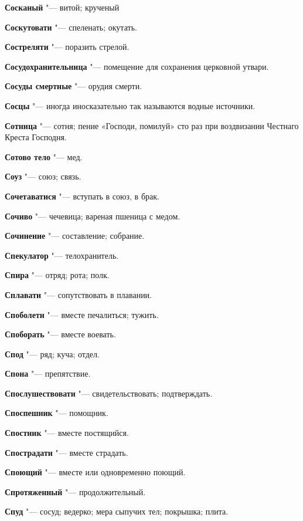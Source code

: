 \begin{mymulticols}
\noindent\textbf{Сосканый} "--- витой; крученый 

\noindent\textbf{Соскутовати} "--- спеленать; окутать. 

\noindent\textbf{Состреляти} "--- поразить стрелой. 

\noindent\textbf{Сосудохранительница} "--- помещение для сохранения церковной утвари. 

\noindent\textbf{Сосуды смертные} "--- орудия смерти. 

\noindent\textbf{Сосцы} "--- иногда иносказательно так называются водные источники. 

\noindent\textbf{Сотница} "--- сотня; пение «Господи, помилуй» сто раз при воздвизании Честнаго Креста Господня. 

\noindent\textbf{Сотово тело} "--- мед. 

\noindent\textbf{Соуз} "--- союз; связь. 

\noindent\textbf{Сочетаватися} "--- вступать в союз, в брак. 

\noindent\textbf{Сочиво} "--- чечевица; вареная пшеница с медом. 

\noindent\textbf{Сочинение} "--- составление; собрание. 

\noindent\textbf{Спекулатор} "--- телохранитель. 

\noindent\textbf{Спира} "--- отряд; рота; полк. 

\noindent\textbf{Сплавати} "--- сопутствовать в плавании. 

\noindent\textbf{Споболети} "--- вместе печалиться; тужить. 

\noindent\textbf{Споборать} "--- вместе воевать. 

\noindent\textbf{Спод} "--- ряд; куча; отдел. 

\noindent\textbf{Спона} "--- препятствие. 

\noindent\textbf{Спослушествовати} "--- свидетельствовать; подтверждать. 

\noindent\textbf{Споспешник} "--- помощник. 

\noindent\textbf{Спостник} "--- вместе постящийся. 

\noindent\textbf{Спострадати} "--- вместе страдать. 

\noindent\textbf{Споющий} "--- вместе или одновременно поющий. 

\noindent\textbf{Спротяженный} "--- продолжительный. 

\noindent\textbf{Спуд} "--- сосуд; ведерко; мера сыпучих тел; покрышка; плита. 


\end{mymulticols}
